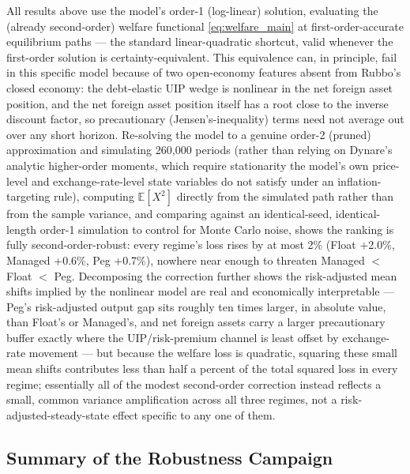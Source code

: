 \documentclass[12pt]{article}
\begin{document}
All results above use the model's order-1 (log-linear) solution, evaluating the (already
second-order) welfare functional \eqref{eq:welfare_main} at first-order-accurate equilibrium paths ---
the standard linear-quadratic shortcut, valid whenever the first-order solution is certainty-equivalent.
This equivalence can, in principle, fail in this specific model because of two open-economy features
absent from Rubbo's closed economy: the debt-elastic UIP wedge is nonlinear in the net foreign asset
position, and the net foreign asset position itself has a root close to the inverse discount factor,
so precautionary (Jensen's-inequality) terms need not average out over any short horizon. Re-solving
the model to a genuine order-2 (pruned) approximation and simulating 260,000 periods (rather than
relying on Dynare's analytic higher-order moments, which require stationarity the model's own
price-level and exchange-rate-level state variables do not satisfy under an inflation-targeting rule),
computing $\mathbb E[X^2]$ directly from the simulated path rather than from the sample variance, and
comparing against an identical-seed, identical-length order-1 simulation to control for Monte Carlo
noise, shows the ranking is fully second-order-robust: every regime's loss rises by at most 2\% (Float
+2.0\%, Managed +0.6\%, Peg +0.7\%), nowhere near enough to threaten Managed $<$ Float $<$ Peg.
Decomposing the correction further shows the risk-adjusted mean shifts implied by the nonlinear model
are real and economically interpretable --- Peg's risk-adjusted output gap sits roughly ten times
larger, in absolute value, than Float's or Managed's, and net foreign assets carry a larger
precautionary buffer exactly where the UIP/risk-premium channel is least offset by exchange-rate
movement --- but because the welfare loss is quadratic, squaring these small mean shifts contributes
less than half a percent of the total squared loss in every regime; essentially all of the modest
second-order correction instead reflects a small, common variance amplification across all three
regimes, not a risk-adjusted-steady-state effect specific to any one of them.

\subsection{Summary of the Robustness Campaign}
\end{document}
